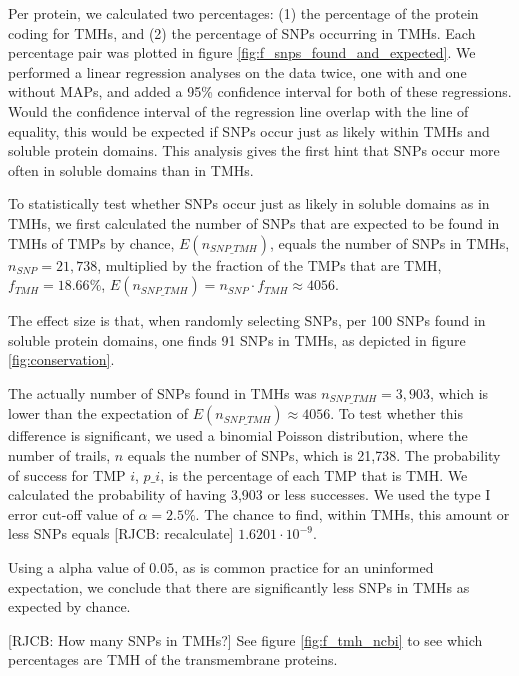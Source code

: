 Per protein, we calculated two percentages: 
(1) the percentage of the protein coding for TMHs, 
and (2) the percentage of SNPs occurring in TMHs.
Each percentage pair was plotted in figure \ref{fig:f_snps_found_and_expected}.
We performed a linear regression analyses on the data twice,
one with and one without MAPs,
and added a 95\% confidence interval for both of these regressions.
Would the confidence interval of the regression line 
overlap with the line of equality,
this would be expected if SNPs occur just as likely within TMHs 
and soluble protein domains.
This analysis gives the first hint that SNPs 
occur more often in soluble domains than in TMHs.

To statistically test whether SNPs occur 
just as likely in soluble domains as
in TMHs, we first calculated the number of SNPs that are expected to be
found in TMHs of TMPs by chance, $E(n_{SNP\_TMH})$,
equals the number of SNPs in TMHs, $n_{SNP} = 21,738$, 
multiplied by the fraction of the TMPs that are TMH, $f_{TMH} = 18.66\%$,
$E(n_{SNP\_TMH}) = n_{SNP} \cdot f_{TMH} \approx 4056$.

The effect size is that, 
when randomly selecting SNPs, 
per 100 SNPs found in soluble protein domains, 
one finds 91 SNPs in TMHs,
as depicted in figure \ref{fig:conservation}.

The actually number of SNPs found in TMHs
was $n_{SNP\_TMH} = 3,903$, which is lower than the expectation
of $E(n_{SNP\_TMH}) \approx 4056$.
To test whether this difference is significant,
we used a binomial Poisson distribution, where the number of trails,
$n$ equals the number of SNPs, which is 21,738. The probability of success
for TMP $i$, $p\_i$, is the percentage of each TMP that is TMH.
We calculated the probability of having 3,903 or less successes.
We used the type I error cut-off value of $\alpha = 2.5\%$.
The chance to find, within TMHs, this amount or less SNPs 
equals [RJCB: recalculate]
$1.6201 \cdot 10^{-9}$.

Using a alpha value of $0.05$, as is common practice for an uninformed
expectation, we conclude that there are significantly less SNPs
in TMHs as expected by chance.

[RJCB: How many SNPs in TMHs?]
See figure \ref{fig:f_tmh_ncbi} to see which percentages
are TMH of the transmembrane proteins.

